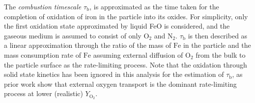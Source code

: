\documentclass[authoryear,preprint,review,12pt]{elsarticle}
\newcommand{\mrm}[1]{\mathrm{#1}}
\newcommand{\taub}{\tau_\mathrm{b}}
\newcommand{\red}{}
\begin{document}
The \textit{combustion timescale} $\taub$, is approximated as the time taken for the completion of oxidation of iron in the particle into its oxides. For simplicity, only the first oxidation state approximated by liquid FeO is considered, and the gaseous medium is assumed to consist of only $\mrm{O_2}$ and $\mrm{N_2}$. $\taub$ is then described as a linear approximation through the ratio of the mass of $\mrm{Fe}$ in the particle and the mass consumption rate of $\mrm{Fe}$ assuming external diffusion of $\mrm{O_2}$ from the bulk to the particle surface as the rate-limiting process. {\red Note that the oxidation through solid state kinetics has been ignored in this analysis for the estimation of $\taub$, as prior work \cite{Ning2021,ning2024experimental,Thijs2023,fujinawa2023,thijs2023surface} show that external oxygen transport is the dominant rate-limiting process at lower (realistic) $Y_\mrm{O_2}$.}
{}
\end{document}
